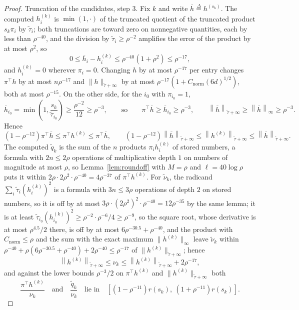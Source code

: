 \documentclass[11pt]{article}
\newcommand{\tautil}{\widetilde{\tau}}
\newcommand{\defeq}{\stackrel{\Delta}{=}}
\newcommand{\Cnorm}{C_{\mathrm{norm}}}
\begin{document}
\begin{proof}
Truncation of the candidates, step 3.
Fix $k$ and write
$\overline{h} \defeq h^{(s_k)}$.
The computed $h^{(k)}_i$ is
$\min(1, \cdot)$ of the truncated quotient of the truncated product
$s_k \pi_i$ by
$\tautil_i$; both truncations are toward zero on nonnegative quantities, each by
less than $\rho^{-40}$, and the division by
$\tautil_i \ge \rho^{-2}$ amplifies the error of the product by at most
$\rho^{2}$, so
\[
0
\le
\overline{h}_i - h^{(k)}_i
\le
\rho^{-40} \left( 1 + \rho^{2} \right)
\le
\rho^{-17},
\]
and $h^{(k)}_i = 0$ wherever
$\pi_i = 0$.
Changing $h$ by at most
$\rho^{-17}$ per entry changes
$\pi^\top h$ by at most
$n \rho^{-17}$ and
$\|h\|_{\tautil + \infty}$ by at most
$\rho^{-17} (1 + \Cnorm (6 d)^{1/2})$, both at most
$\rho^{-15}$.
On the other side, for the $i_0$ with
$\pi_{i_0} = 1$,
\[
\overline{h}_{i_0}
=
\min\left( 1, \frac{s_k}{\tautil_{i_0}} \right)
\ge
\frac{\rho^{-2}}{12}
\ge
\rho^{-3},
\qquad
\text{so}
\qquad
\pi^\top \overline{h}
\ge
\overline{h}_{i_0}
\ge
\rho^{-3},
\qquad
\left\| \overline{h} \right\|_{\tautil + \infty}
\ge
\left\| \overline{h} \right\|_{\infty}
\ge
\rho^{-3} .
\]
Hence
\[
\left( 1 - \rho^{-12} \right) \pi^\top \overline{h}
\le
\pi^\top h^{(k)}
\le
\pi^\top \overline{h},
\qquad
\left( 1 - \rho^{-12} \right)
\left\| \overline{h} \right\|_{\tautil + \infty}
\le
\left\| h^{(k)} \right\|_{\tautil + \infty}
\le
\left\| \overline{h} \right\|_{\tautil + \infty} .
\]
The computed $\widetilde{q}_k$ is the sum of the
$n$ products
$\pi_i h^{(k)}_i$ of stored numbers, a formula with
$2 n \le 2 \rho$ operations of multiplicative depth
$1$ on numbers of magnitude at most
$\rho$, so Lemma~\ref{lem:roundoff} with
$M = \rho$ and
$\ell = 40 \log \rho$ puts it within
$2 \rho \cdot 2 \rho^{2} \cdot \rho^{-40} = 4 \rho^{-37}$ of
$\pi^\top h^{(k)}$.
For $\widetilde{\nu}_k$, the radicand
$\sum_i \tautil_i (h^{(k)}_i)^{2}$ is a formula with
$3 n \le 3 \rho$ operations of depth
$2$ on stored numbers, so it is off by at most
$3 \rho \cdot (2 \rho^{2})^{2} \cdot \rho^{-40} = 12 \rho^{-35}$ by the same
lemma; it is at least
$\tautil_{i_0} (h^{(k)}_{i_0})^{2} \ge \rho^{-2} \cdot \rho^{-6} / 4 \ge \rho^{-9}$,
so the square root, whose derivative is at most $\rho^{4.5} / 2$ there, is off
by at most $6 \rho^{-30.5} + \rho^{-40}$, and the product with
$\Cnorm \le \rho$ and the sum with the exact maximum
$\|h^{(k)}\|_{\infty}$ leave
$\widetilde{\nu}_k$ within
$\rho^{-40} + \rho \left( 6 \rho^{-30.5} + \rho^{-40} \right) + 2 \rho^{-40} \le \rho^{-17}$
of $\|h^{(k)}\|_{\tautil + \infty}$; hence
\[
\left\| h^{(k)} \right\|_{\tautil + \infty}
\le
\nu_k
\le
\left\| h^{(k)} \right\|_{\tautil + \infty} + 2 \rho^{-17},
\]
and against the lower bounds $\rho^{-3} / 2$ on
$\pi^\top h^{(k)}$ and
$\|h^{(k)}\|_{\tautil + \infty}$ both
\begin{equation}
\label{eq:candidate_ratio}
\frac{\pi^\top h^{(k)}}{\nu_k}
\quad \text{and} \quad
\frac{\widetilde{q}_k}{\nu_k}
\quad \text{lie in} \quad
\left[ \left( 1 - \rho^{-11} \right) r(s_k), \
\left( 1 + \rho^{-11} \right) r(s_k) \right] .
\end{equation}


\end{proof}
\end{document}
